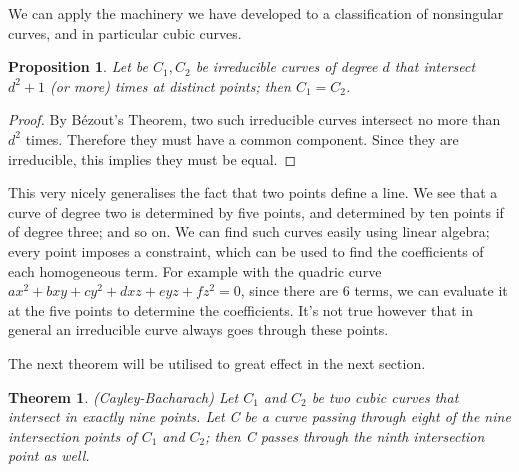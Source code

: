 \documentclass{article}
\newtheorem{theorem}{Theorem}
\newtheorem{proposition}{Proposition}
\theoremstyle{remark}
\begin{document}
\par
We can apply the machinery we have developed to a classification of nonsingular curves, and in particular cubic curves. 
\begin{proposition}
Let be $C_1,C_2$ be irreducible curves of degree $d$ that intersect $d^2+1$ (or more) times at distinct points; then $C_1=C_2$.
\end{proposition}
\begin{proof}
By Bézout's Theorem, two such irreducible curves intersect no more than $d^2$ times. Therefore they must have a common component. Since they are irreducible, this implies they must be equal.
\end{proof}
This very nicely generalises the fact that two points define a line. We see that a curve of degree two is determined by five points, and determined by ten points if of degree three; and so on. We can find such curves easily using linear algebra; every point imposes a constraint, which can be used to find the coefficients of each homogeneous term. For example with the quadric curve  $ax^2+bxy+cy^2+dxz+eyz+fz^2=0$, since there are 6 terms, we can evaluate it at the five points to determine the coefficients. It's not true however that in general an irreducible curve always goes through these points.
\par The next theorem will be utilised to great effect in the next section.
\begin{theorem}(Cayley-Bacharach) Let $C_1$ and $C_2$ be two cubic curves that intersect in exactly nine points. Let C be a curve passing through eight of the nine intersection points of $C_1$ and $C_2$; then C passes through
the ninth intersection point as well.
\end{theorem}
\end{document}
